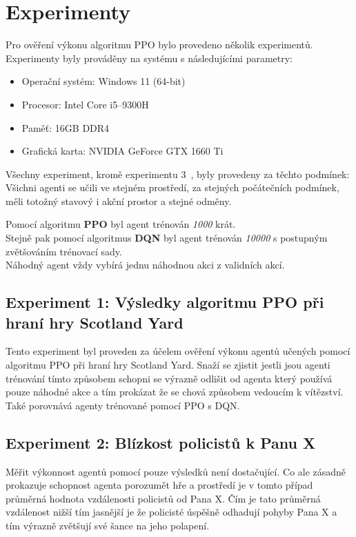 \chapter{Experimenty}
\label{ch:experimenty}

Pro ověření výkonu algoritmu PPO bylo provedeno několik experimentů.
Experimenty byly prováděny na systému s následujícími parametry:

\begin{itemize}
  \item Operační systém: Windows 11 (64-bit)
  \item Procesor: Intel Core i5--9300H
  \item Paměť: 16GB DDR4
  \item Grafická karta: NVIDIA GeForce GTX 1660 Ti
\end{itemize}

Všechny experiment, kromě experimentu 3~, byly provedeny za těchto podmínek:\\
Všichni agenti se učili ve stejném prostředí, za stejných počátečních podmínek, měli totožný stavový i akční prostor a stejné odměny.

\bigskip
\noindent Pomocí algoritmu \textbf{PPO} byl agent trénován \emph{1000} krát.\\
Stejně pak pomocí algoritmus \textbf{DQN} byl agent trénován \emph{10000} s postupným zvětšováním trénovací sady.\\
Náhodný agent vždy vybírá jednu náhodnou akci z validních akcí.

\section{Experiment 1: Výsledky algoritmu PPO při hraní hry Scotland Yard}
\label{sec:experiment-1}

Tento experiment byl proveden za účelem ověření výkonu agentů učených pomocí algoritmu PPO při hraní hry Scotland Yard.
Snaží se zjistit jestli jsou agenti trénování tímto způsobem schopni se výrazně odlišit od agenta který používá pouze náhodné akce a tím prokázat že se chová způsobem vedoucím k vítězství.
Také porovnává agenty trénované pomocí PPO s DQN\@.

\section{Experiment 2: Blízkost policistů k Panu X}
\label{sec:experiment-2}

Měřit výkonnost agentů pomocí pouze výsledků není dostačující.
Co ale zásadně prokazuje schopnost agenta porozumět hře a prostředí je v tomto případ průměrná hodnota vzdálenosti policistů od Pana X.
Čím je tato průměrná vzdálenost nižší tím jasnější je že policisté úspěšně odhadují pohyby Pana X a tím výrazně zvětšují své šance na jeho polapení.

